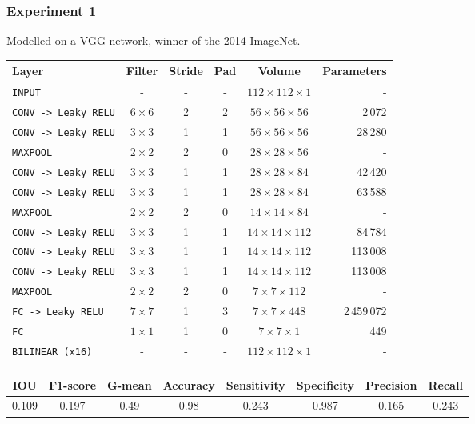\documentclass{beamer}
\begin{document}
	\begin{frame}
		\frametitle{Experiment 1}
		Modelled on a VGG network, winner of the 2014 ImageNet.
		\footnotesize
		\begin{table}[h]
			\centering
			\begin{tabular}{lccccr}
			\hline
			\textbf{Layer} & \textbf{Filter} & \textbf{Stride} &\textbf{Pad} & \textbf{Volume} & \textbf{Parameters} \\
			\hline
			\texttt{INPUT}	& -	& - & - & $112 \times 112 \times 1$ & -\\
			\texttt{CONV -> Leaky RELU} & $6 \times 6$ & 2 & 2 & $56 \times 56 \times 56$ & 2\,072\\
			\texttt{CONV -> Leaky RELU} & $3 \times 3$ & 1 & 1 & $56 \times 56 \times 56$ & 28\,280\\
			\texttt{MAXPOOL} & $2 \times 2$ & 2 & 0 & $28 \times 28 \times 56$ & -\\
			\texttt{CONV -> Leaky RELU} & $3 \times 3$ & 1 & 1 & $28 \times 28 \times 84$ & 42\,420\\
			\texttt{CONV -> Leaky RELU} & $3 \times 3$ & 1 & 1 & $28 \times 28 \times 84$ & 63\,588\\
			\texttt{MAXPOOL} & $2 \times 2$ & 2 & 0 & $14 \times 14 \times 84$ & -\\
			\texttt{CONV -> Leaky RELU} & $3 \times 3$ & 1 & 1 & $14 \times 14 \times 112$ & 84\,784\\
			\texttt{CONV -> Leaky RELU} & $3 \times 3$ & 1 & 1 & $14 \times 14 \times 112$ & 113\,008\\
			\texttt{CONV -> Leaky RELU} & $3 \times 3$ & 1 & 1 & $14 \times 14 \times 112$ & 113\,008\\
			\texttt{MAXPOOL} & $2 \times 2$ & 2 & 0 & $7 \times 7 \times 112$ & -\\
			\texttt{FC -> Leaky RELU} & $7 \times 7$ & 1 & 3 & $7 \times 7 \times 448$ & 2\,459\,072\\
			\texttt{FC} & $1 \times 1$ & 1 & 0 & $7 \times 7 \times 1$ & 449 \\
			\texttt{BILINEAR (x16)} & - & - & - & $112 \times 112 \times 1$ & -\\
			\hline
			\end{tabular}
		\end{table}
		
		\scriptsize
		\begin{table}[h]
			\centering
			\begin{tabular}{cccccccc}
			\hline
			\textbf{IOU}	& \textbf{F1-score}	& \textbf{G-mean} &\textbf{Accuracy}	& \textbf{Sensitivity} & \textbf{Specificity} & \textbf{Precision} & \textbf{Recall}\\
			\hline
			0.109 & 0.197 & 0.49 & 0.98 & 0.243 & 0.987 & 0.165 & 0.243 \\
			\hline
			\end{tabular}
		\end{table}

	\end{frame}
\end{document}
